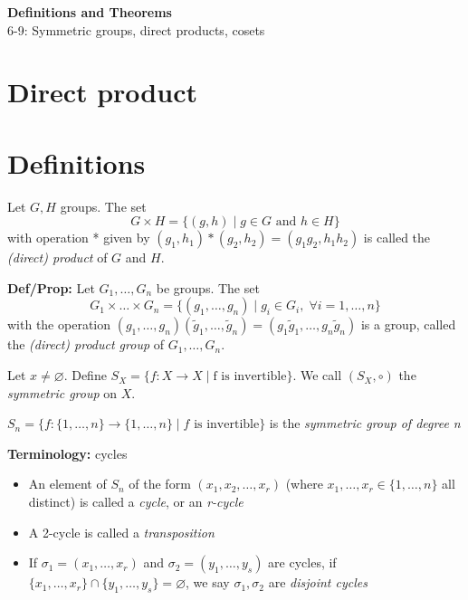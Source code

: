 \noindent
\textbf{\LARGE Definitions and Theorems} \\
\large 6-9: Symmetric groups, direct products, cosets 

\normalsize 

\section*{Direct product}







\section*{Definitions}
 Let $G, H$ groups. The set 
\[G \times H = \{(g, h) \mid g \in G \text{ and } h \in H\}\] 
with operation * given by $(g_1, h_1) \ast (g_2, h_2) = (g_1g_2, h_1h_2)$
is called the \textit{(direct) product} of $G$ and $H$.

\bigskip
\noindent
\textbf{Def/Prop:} Let $G_1, \ldots, G_n$ be groups. The set 
\[G_1 \times \ldots \times G_n = \{(g_1, \ldots, g_n) \mid g_i \in G_i, \; \forall i = 1, \ldots, n\}\]
with the operation $(g_1, \ldots, g_n)(\tilde{g}_1, \ldots, \tilde{g}_n) = (g_1\tilde{g}_1, \ldots, g_n\tilde{g}_n)$
is a group, called the \textit{(direct) product group} of $G_1, \ldots, G_n$.

 Let $x \ne \varnothing$. Define $S_X = \{f:X \rightarrow X \mid \text{f is invertible}\}$. We call $(S_X, \circ)$ the \textit{symmetric group} on $X$.

 $S_n = \{f: \{1, \ldots, n \} \rightarrow \{1, \ldots, n \} \mid \text{$f$ is invertible} \}$ is the \textit{symmetric group of degree n}

\bigskip 
\noindent 
\textbf{Terminology:} cycles 
\begin{itemize}
    \item An element of $S_n$ of the form $(x_1, x_2, \ldots, x_r)$ (where $x_1, \ldots, x_r \in \{1, \ldots, n \}$ all distinct) is called a \textit{cycle}, or an \textit{r-cycle}
    \item A 2-cycle is called a \textit{transposition}
    \item If $\sigma_1 = (x_1, \ldots, x_r)$ and $\sigma_2 = (y_1, \ldots, y_s)$ are cycles, if $\{x_1, \ldots, x_r\} \cap \{y_1, \ldots, y_s\} = \varnothing $, we say $\sigma_1, \sigma_2$ are \textit{disjoint cycles}
\end{itemize}

